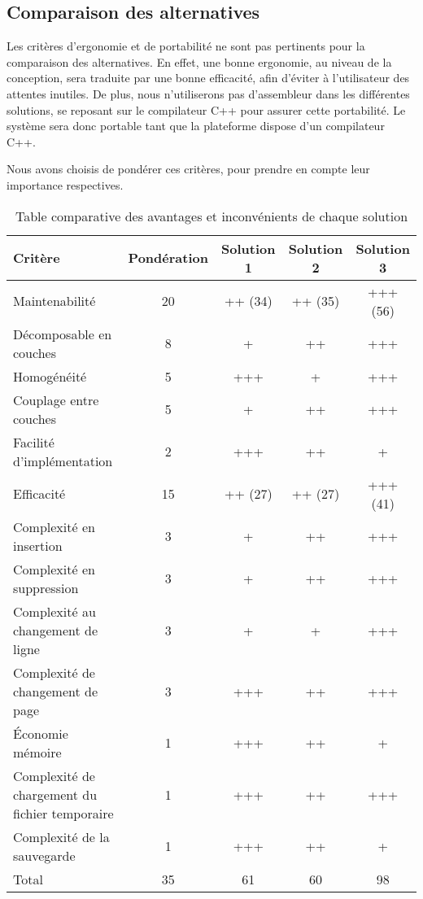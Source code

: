 \subsection{Comparaison des alternatives}

Les critères d'ergonomie et de portabilité ne sont pas pertinents pour la
comparaison des alternatives.
En effet, une bonne ergonomie, au niveau de la conception, sera traduite par une
bonne efficacité, afin d'éviter à l'utilisateur des attentes inutiles.
De plus, nous n'utiliserons pas d'assembleur dans les différentes solutions, se
reposant sur le compilateur C++ pour assurer cette portabilité. Le système sera
donc portable tant que la plateforme dispose d'un compilateur C++.

Nous avons choisis de pondérer ces critères, pour prendre en compte leur
importance respectives.

\begin{table}[H]
	\centering
	\begin{tabular}{l c|c|c|c}
		Critère & Pondération & Solution 1 & Solution 2 & Solution 3 \\
		\hline \hline
		Maintenabilité & 20 & ++ (34) & ++ (35) & +++ (56) \\
		\hline
		Décomposable en couches & 8 & + & ++ & +++ \\
		Homogénéité & 5 & +++ & + & +++ \\
		Couplage entre couches & 5 & + & ++ & +++ \\
		Facilité d'implémentation & 2 & +++ & ++ & + \\
		\hline \hline
		Efficacité & 15 & ++ (27) & ++ (27) & +++ (41) \\
		\hline
		Complexité en insertion & 3 & + & ++ & +++ \\
		Complexité en suppression & 3 & + & ++ & +++ \\
		Complexité au changement de ligne & 3 & + & + & +++ \\
		Complexité de changement de page & 3 & +++ & ++ & +++ \\
		Économie mémoire & 1 & +++ & ++ & + \\
		Complexité de chargement du fichier temporaire & 1 & +++ & ++ & +++ \\
		Complexité de la sauvegarde & 1 & +++ & ++ & + \\
		\hline
		Total & 35 & 61 & 60 & 98 \\
	\end{tabular}
	\vspace{0.5cm}
	\caption{Table comparative des avantages et inconvénients de chaque solution}
\end{table}



